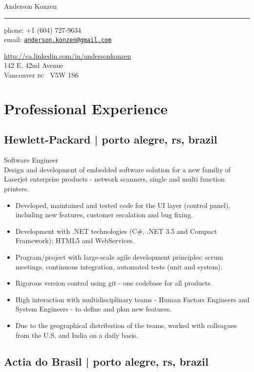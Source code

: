 \documentclass[10pt,a4paper]{article}
\makeatletter
\def\myname{Anderson Konzen}
\def\myemail{anderson.konzen@gmail.com}
\def\myskype{andersonkonzen}
\def\mycellphone{+1 (604) 727-9634}
\def\mylinkedin{http://ca.linkedin.com/in/andersonkonzen}
\def\myaddress{142 E. 42nd Avenue\\Vancouver \textsc{bc} \ V5W 1S6}
\newcommand{\years}[1]{\marginnote{#1}}
\makeatother
\begin{document}
{\LARGE \myname}\\
\hrule
\vspace{0.2in}
{\large phone: \mycellphone}\\[.05cm]
{\large email: \href{mailto:\myemail}{\texttt{\myemail}}}\\[.05cm]
{\large \href{\mylinkedin}{\mylinkedin}\\[.2cm]
\myaddress
\vspace{0.5in}

\section*{Professional Experience}

\subsection*{Hewlett-Packard | {\footnotesize{porto alegre, rs, brazil}}}

\years{2010-2012}Software Engineer\\
Design and development of embedded software solution for a new familiy of Laserjet enterprise products - network scanners, single and multi function printers.
\begin{itemize}
\item Developed, maintained and tested code for the UI layer (control panel), including new features, customer escalation and bug fixing.
\item Development with .NET technologies (C\#, .NET 3.5 and Compact Framework); HTML5 and WebServices.
\item Program/project with large-scale agile development principles: scrum meetings, continuous integration, automated tests (unit and system).
\item Rigorous version control using git - one codebase for all products.
\item High interaction with multidisciplinary teams - Human Factors Engineers and System Engineers - to define and plan new features.
\item Due to the geographical distribution of the teams, worked with colleagues from the U.S. and India on a daily basis.
\end{itemize}

\subsection*{Actia do Brasil | {\footnotesize{porto alegre, rs, brazil}}}

}
\end{document}
